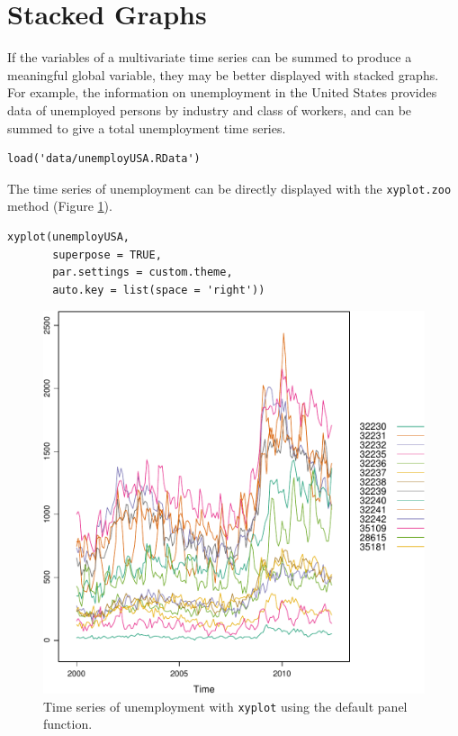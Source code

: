 \section{Stacked Graphs \label{sec:stacked}}
\label{sec:orgf56e2aa}
If the variables of a multivariate time series can be summed to
produce a meaningful global variable, they may be better displayed
with stacked graphs. For example, the information on unemployment in
the United States provides data of unemployed persons by industry and
class of workers, and can be summed to give a total unemployment time
series.

\lstset{language=r,label= ,caption= ,captionpos=b,numbers=none}
\begin{lstlisting}
load('data/unemployUSA.RData')
\end{lstlisting}

The time series of unemployment can be directly displayed
with the \texttt{xyplot.zoo} method (Figure \ref{fig:unemployUSAxyplot}).

\lstset{language=r,label= ,caption= ,captionpos=b,numbers=none}
\begin{lstlisting}
xyplot(unemployUSA,
       superpose = TRUE,
       par.settings = custom.theme,
       auto.key = list(space = 'right'))
\end{lstlisting}

\begin{figure}[htbp]
\centering
\includegraphics[width=.9\linewidth]{figs/unemployUSAxyplot.pdf}
\caption{Time series of unemployment  with \texttt{xyplot} using the default panel function. \label{fig:unemployUSAxyplot}}
\end{figure}

